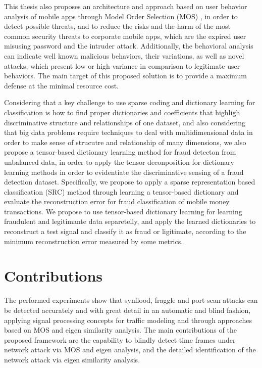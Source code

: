 This thesis also proposes an architecture and approach based on user behavior analysis of mobile apps through Model Order Selection (MOS) \cite{tenorio2013greatest}, in order to detect possible threats, and to reduce the risks and the harm of the most common security threats to corporate mobile apps, which are the expired user misusing password and the intruder attack. Additionally, the behavioral analysis can indicate well known malicious behaviors, their variations, as well as novel attacks, which present low or high variance in comparison to legitimate user behaviors. The main target of this proposed solution is to provide a maximum defense at the minimal resource cost.

Considering that a key challenge to use sparse coding and dictionary learning for classification is how to find proper dictionaries and coefficients that highligh discriminative structure and relationships of one dataset, and also considering that big data problems require techniques to deal with multidimensional data in order to make sense of strucutre and relationship of many dimensions, we also propose a tensor-based dictionary learning method for fraud detecton from unbalanced data, in order to apply the tensor deconposition for dictionary learning methods in order to evidentiate the discriminative sensing of a fraud detection dataset. Specifically, we propose to apply a sparse representation based classification (SRC) method through learning a tensor-based dictionary and evaluate the reconstruction error for fraud classification of mobile money transactions. We propose to use tensor-based dictionary learning for learning fraudulent and legitimante data separetelly, and apply the learned dictionaries to reconstruct a test signal and classify it as fraud or ligitimate, according to the minimum reconstruction error measured by some metrics.


\section{Contributions}
\label{sc:contributions}

The performed experiments show that synflood, fraggle and port scan attacks can be detected accurately and with great detail in an automatic and blind fashion, applying signal processing concepts for traffic modeling and through approaches based on MOS and eigen similarity analysis. The main contributions of the proposed framework are the capability to blindly detect time frames under network attack via MOS and eigen analysis, and the detailed identification of the network attack via eigen similarity analysis.

